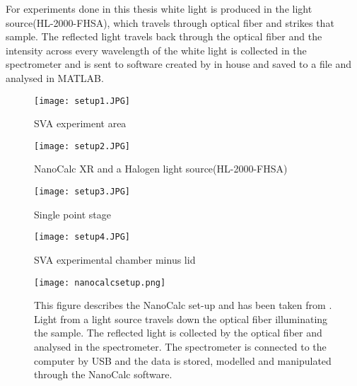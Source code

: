 \documentclass[MasterThesisMain.tex]{subfiles}
\begin{document}
For experiments done in this thesis white light is produced in the light source(HL-2000-FHSA), which travels through optical fiber and strikes that sample. The reflected light travels back through the optical fiber and the intensity across every wavelength of the white light is collected in the spectrometer and is sent to software created by in house and saved to a file and analysed in MATLAB\textsuperscript{\textregistered}.  
	
	\begin{figure}[ht] 
	  \begin{minipage}[b]{0.5\linewidth}
	    \centering
	    \texttt{[image: setup1.JPG]} 
	    \caption{SVA experiment area}
	    \label{fig:exparea}  
	    \vspace{4ex}
	  \end{minipage}%
	  \begin{minipage}[b]{0.5\linewidth}
	    \centering
	    \texttt{[image: setup2.JPG]} 
	    \caption{NanoCalc XR and a Halogen light source(HL-2000-FHSA)}
	    \label{fig:speclight} 
	    \vspace{4ex}
	  \end{minipage} 
	  \begin{minipage}[b]{0.5\linewidth}
	    \centering
	    \texttt{[image: setup3.JPG]} 
	    \caption{Single point stage} 
	    \label{fig:Singlestage}
	    \vspace{4ex}
	  \end{minipage}%
	  \begin{minipage}[b]{0.5\linewidth}
	    \centering
	    \texttt{[image: setup4.JPG]} 
	    \caption{SVA experimental chamber \break minus lid}
	    \label{fig:SVAchamber} 
	    \vspace{4ex}
	  \end{minipage} 
	\end{figure}
	
	\begin{figure}
	\centering
		\texttt{[image: nanocalcsetup.png]}
		\caption{This figure describes the NanoCalc set-up and has been taken from \cite{nanocalcmanual}. Light from a light source travels down the optical fiber illuminating the sample. The reflected light is collected by the optical fiber and analysed in the spectrometer. The spectrometer is connected to the computer by USB and the data is stored, modelled and manipulated through the NanoCalc software.}
		\label{fig:nanocalcsetup}
	\end{figure}
	
\end{document}
